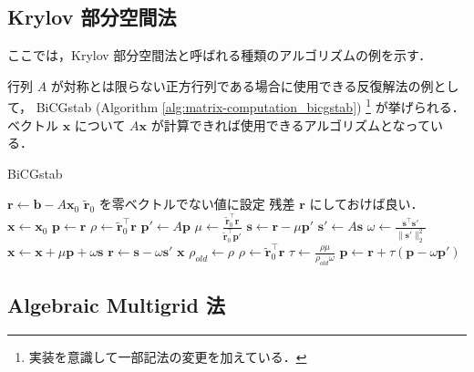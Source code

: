 \clearpage

\subsection{Krylov 部分空間法}

ここでは，Krylov 部分空間法と呼ばれる種類のアルゴリズムの例を示す．


行列 $A$ が対称とは限らない正方行列である場合に使用できる反復解法の例として，
BiCGstab (Algorithm \ref{alg:matrix-computation_bicgstab})
\footnote{実装を意識して一部記法の変更を加えている．}
が挙げられる．
ベクトル $\bm{x}$ について $A \bm{x}$ が計算できれば使用できるアルゴリズムとなっている．

\begin{algorithm}[tp]
    \caption{BiCGstab \cite{Golub2013}}
    \label{alg:matrix-computation_bicgstab}
    \begin{algorithmic}[1]
        \State $\bm{r} \gets \bm{b} - A \bm{x}_0$
        \State $\tilde{\bm{r}}_0$ を零ベクトルでない値に設定
        \Comment 残差 $\bm{r}$ にしておけば良い．
        \State $\bm{x} \gets \bm{x}_0$
        \State $\bm{p} \gets \bm{r}$
        \State $\rho \gets \tilde{\bm{r}}_0^\top \bm{r}$
        \Loop
        \State $\bm{p}' \gets A \bm{p}$
        \State $\mu \gets \frac{\tilde{\bm{r}}_0^\top \bm{r}}{\tilde{\bm{r}}_0^\top \bm{p}'}$
        \State $\bm{s} \gets \bm{r} - \mu \bm{p}'$
        \State $\bm{s}' \gets A \bm{s}$
        \State $\omega \gets \frac{\bm{s}^\top \bm{s}'}{\|\bm{s}'\|_2^2}$
        \State $\bm{x} \gets \bm{x} + \mu \bm{p} + \omega \bm{s}$
        \State $\bm{r} \gets \bm{s} - \omega \bm{s}'$
        \State \Return $\bm{x}$
        \EndIf
        \State $\rho_{old} \gets \rho$
        \State $\rho \gets \tilde{\bm{r}}_0^\top \bm{r}$
        \State $\tau \gets \frac{\rho \mu}{\rho_{old} \omega}$
        \State $\bm{p} \gets \bm{r} + \tau(\bm{p} - \omega \bm{p}')$
        \EndLoop
        \EndProcedure
    \end{algorithmic}
\end{algorithm}

\subsection{Algebraic Multigrid 法}

